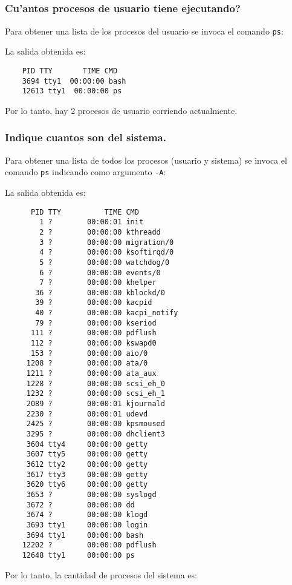 \subsection{}
\subsubsection[]{Cu'antos procesos de usuario tiene ejecutando?}
Para obtener una lista de los procesos del usuario se invoca el comando \texttt{ps}:

La salida obtenida es:
       \begin{mylisting}
       \begin{verbatim}
	PID TTY       TIME CMD
	3694 tty1  00:00:00 bash
	12613 tty1  00:00:00 ps
      \end{verbatim}
      \end{mylisting}
Por lo tanto, hay 2 procesos de usuario corriendo actualmente.

\subsubsection[]{Indique cuantos son del sistema.}
Para obtener una lista de todos los procesos (usuario y sistema) se invoca el comando \texttt{ps} indicando como argumento \texttt{-A}:

La salida obtenida es:
      \begin{mylisting}
      \begin{verbatim}
	  PID TTY          TIME CMD
	    1 ?        00:00:01 init
	    2 ?        00:00:00 kthreadd
	    3 ?        00:00:00 migration/0
	    4 ?        00:00:00 ksoftirqd/0
	    5 ?        00:00:00 watchdog/0
	    6 ?        00:00:00 events/0
	    7 ?        00:00:00 khelper
	   36 ?        00:00:00 kblockd/0
	   39 ?        00:00:00 kacpid
	   40 ?        00:00:00 kacpi_notify
	   79 ?        00:00:00 kseriod
	  111 ?        00:00:00 pdflush
	  112 ?        00:00:00 kswapd0
	  153 ?        00:00:00 aio/0
	 1208 ?        00:00:00 ata/0
	 1211 ?        00:00:00 ata_aux
	 1228 ?        00:00:00 scsi_eh_0
	 1232 ?        00:00:00 scsi_eh_1
	 2089 ?        00:00:01 kjournald
	 2230 ?        00:00:01 udevd
	 2425 ?        00:00:00 kpsmoused
	 3295 ?        00:00:00 dhclient3
	 3604 tty4     00:00:00 getty
	 3607 tty5     00:00:00 getty
	 3612 tty2     00:00:00 getty
	 3617 tty3     00:00:00 getty
	 3620 tty6     00:00:00 getty
	 3653 ?        00:00:00 syslogd
	 3672 ?        00:00:00 dd
	 3674 ?        00:00:00 klogd
	 3693 tty1     00:00:00 login
	 3694 tty1     00:00:00 bash
	12202 ?        00:00:00 pdflush
	12648 tty1     00:00:00 ps
      \end{verbatim}
      \end{mylisting}
Por lo tanto, la cantidad de procesos del sistema es:

